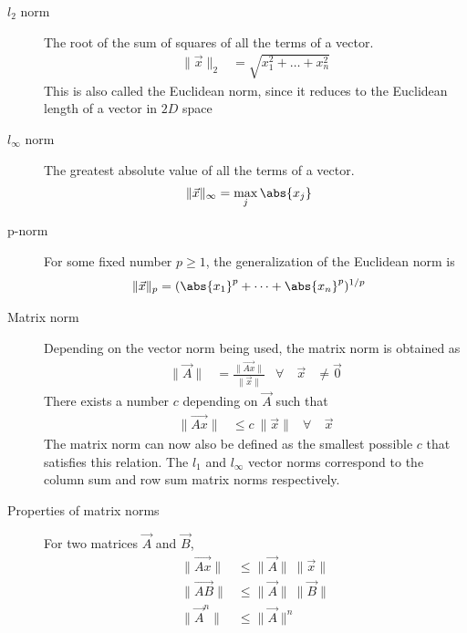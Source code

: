 \begin{description}
    \item[$ l_2 $ norm] The root of the sum of squares of all the terms of a vector.
        \begin{align}
            \lVert \vec{x} \rVert_2 & = \sqrt{x_1^2 + \dots + x_n^2}
        \end{align}
        This is also called the Euclidean norm, since it reduces to the Euclidean
        length of a vector in $ 2D $ space

    \item[$ l_\infty $ norm] The greatest absolute value of all the terms of a vector.
        \begin{align}
            \lVert \vec{x} \rVert_\infty & = \max_{j} \abs{x_j}
        \end{align}

    \item[p-norm] For some fixed number $ p \geq 1 $, the generalization of the
        Euclidean norm is
        \begin{align}
            \lVert \vec{x} \rVert_p & = (\abs{x_1}^p + \dots + \abs{x_n}^p)^{1/p}
        \end{align}

    \item[Matrix norm] Depending on the vector norm being used, the matrix norm is
        obtained as
        \begin{align}
            \lVert \vec{A} \rVert   & = \frac{\lVert \vec{Ax} \rVert}
            {\lVert \vec{x} \rVert} &
            \forall \quad \vec{x}   & \neq \vec{0}
        \end{align}
        There exists a number $ c $ depending on $ \vec{A} $ such that
        \begin{align}
            \lVert \vec{Ax} \rVert & \leq c\ \lVert \vec{x} \rVert &
            \forall                & \ \vec{x}
        \end{align}
        The matrix norm can now also be defined as the smallest possible $ c $ that
        satisfies this relation.
        The $ l_1 $ and $ l_\infty $ vector norms correspond to the column sum and
        row sum matrix norms respectively.

    \item[Properties of matrix norms] For two matrices $ \vec{A} $ and $ \vec{B} $,
        \begin{align}
            \lVert \vec{Ax} \rVert  & \leq \lVert \vec{A} \rVert\ \lVert \vec{x}
            \rVert                                                               \\
            \lVert \vec{AB} \rVert  & \leq \lVert \vec{A} \rVert\ \lVert \vec{B}
            \rVert                                                               \\
            \lVert \vec{A}^n \rVert & \leq \lVert \vec{A} \rVert^n
        \end{align}


\end{description}
